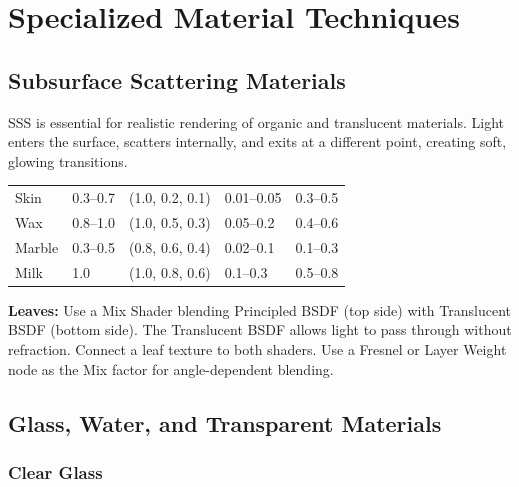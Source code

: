 \section{Specialized Material Techniques}
\label{sec:shading:specialized}

\subsection{Subsurface Scattering Materials}

SSS is essential for realistic rendering of organic and translucent
materials. Light enters the surface, scatters internally, and exits
at a different point, creating soft, glowing transitions.

\begin{center}
\begin{tabularx}{\textwidth}{L{2.5cm}C{1.5cm}C{2.8cm}C{1.5cm}C{1.5cm}}
\toprule
{}
 &  &  &  &  \\
\midrule
Skin & 0.3--0.7 & (1.0, 0.2, 0.1) & 0.01--0.05 & 0.3--0.5 \\
Wax & 0.8--1.0 & (1.0, 0.5, 0.3) & 0.05--0.2 & 0.4--0.6 \\
Marble & 0.3--0.5 & (0.8, 0.6, 0.4) & 0.02--0.1 & 0.1--0.3 \\
Milk & 1.0 & (1.0, 0.8, 0.6) & 0.1--0.3 & 0.5--0.8 \\
\bottomrule
\end{tabularx}
\end{center}

\textbf{Leaves:} Use a Mix Shader blending Principled BSDF (top
side) with Translucent BSDF (bottom side). The Translucent BSDF
allows light to pass through without refraction. Connect a leaf
texture to both shaders. Use a Fresnel or Layer Weight node as the
Mix factor for angle-dependent blending.

\subsection{Glass, Water, and Transparent Materials}

\subsubsection{Clear Glass}

